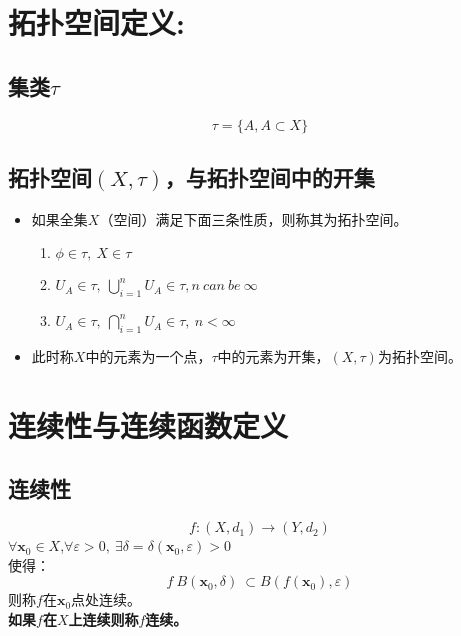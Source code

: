 \documentclass[11pt]{article}
\begin{document}
\begin{CJK*}{UTF8}{gbsn}
\section{拓扑空间定义:}
\subsection{集类$\tau$}
\begin{equation}
	\tau = \{ A, A\subset X\}
\end{equation}
\subsection{拓扑空间$(X,\tau)$，与拓扑空间中的开集}
\begin{itemize}
	\item 	如果全集$X$（空间）满足下面三条性质，则称其为拓扑空间。
		\begin{enumerate}
			\item $\phi \in \tau,~X \in \tau$
			\item $U_A\in \tau ,~\bigcup_{i=1}^{n}{U_A}\in \tau ,n~can~be~\infty$
			\item $U_A\in \tau ,~\bigcap_{i=1}^{n}{U_A}\in \tau,~n<\infty $
		\end{enumerate}
	\item 此时称$X$中的元素为一个点，$\tau$中的元素为开集，$(X,\tau)$为拓扑空间。
\end{itemize}

\section{连续性与连续函数定义}
\subsection{连续性}
\begin{equation*}
	f:(X,d_1)\rightarrow(Y,d_2)
\end{equation*}
$\forall \bm x_0 \in X$,$\forall \varepsilon >0,~\exists \delta=\delta(\bm x_0,\varepsilon )>0$\\
使得：
\begin{equation*}
	f~B(\bm x_0,\delta )~\subset B(f(\bm x_0),\varepsilon )
\end{equation*}
则称$f$在$\bm x_0$点处连续。\\
\textbf{如果$f$在$X$上连续则称$f$连续。}


\end{CJK*}
\end{document}
